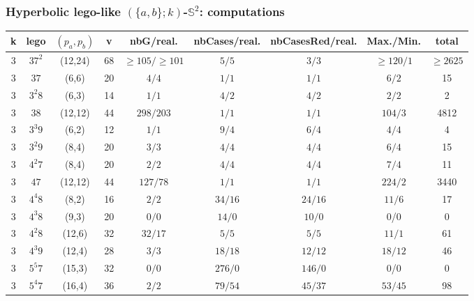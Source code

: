 \documentclass{beamer}
\begin{document}
\begin{frame}\frametitle{Hyperbolic lego-like   $(\{a,b\}; k)$-$\mathbb{S}^2$: computations }
\vspace{-4mm}
\begin{center}
\tiny
\begin{tabular}{||c|c|c|c|c|c|c|c|c||}
\hline \hline
k & lego & $(p_a, p_b)$ & v & nbG/real. & nbCases/real. & nbCasesRed/real. & Max./Min. & total\\
\hline \hline
3 & $37^{2}$ & (12,24) & 68 & $\geq 105/\geq 101$ & $5/5$ & $3/3$ & $\geq 120/1$ & $\geq 2625$\\\hline
3 & $37$ & (6,6) & 20 & $4/4$ & $1/1$ & $1/1$ & $6/2$ & 15\\\hline
3 & $3^{2}8$ & (6,3) & 14 & $1/1$ & $4/2$ & $4/2$ & $2/2$ & 2\\
3 & $38$ & (12,12) & 44 & $298/203$ & $1/1$ & $1/1$ & $104/3$ & 4812\\ \hline
3 & $3^{3}9$ & (6,2) & 12 & $1/1$ & $9/4$ & $6/4$ & $4/4$ & 4\\
3 & $3^{2}9$ & (8,4) & 20 & $3/3$ & $4/4$ & $4/4$ & $6/4$ & 15\\
\hline \hline
3 & $4^{2}7$ & (8,4) & 20 & $2/2$ & $4/4$ & $4/4$ & $7/4$ & 11\\
3 & $47$ & (12,12) & 44 & $127/78$ & $1/1$ & $1/1$ & $224/2$ & 3440\\\hline
3 & $4^{4}8$ & (8,2) & 16 & $2/2$ & $34/16$ & $24/16$ & $11/6$ & 17\\
3 & $4^{3}8$ & (9,3) & 20 & $0/0$ & $14/0$ & $10/0$ & 0/0 & 0\\
3 & $4^{2}8$ & (12,6) & 32 & $32/17$ & $5/5$ & $5/5$ & $11/1$ & 61\\\hline
3 & $4^{3}9$ & (12,4) & 28 & $3/3$ & $18/18$ & $12/12$ & $18/12$ & 46\\
\hline \hline
3 & $5^{5}7$ & (15,3) & 32 & $0/0$ & $276/0$ & $146/0$ & 0/0 & 0\\
3 & $5^{4}7$ & (16,4) & 36 & $2/2$ & $79/54$ & $45/37$ & $53/45$ & 98\\

\end{tabular}
\end{center}
\end{frame}
\end{document}
